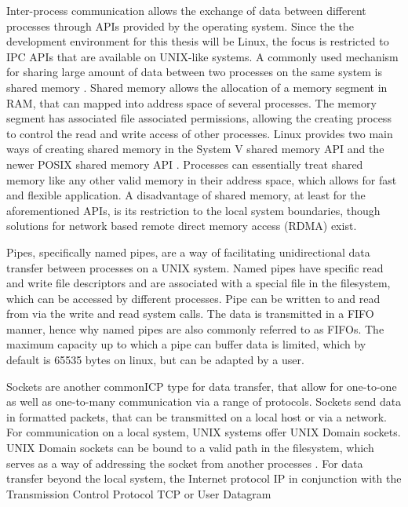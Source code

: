Inter-process communication allows the exchange of data between different processes through \acp{API} provided by the operating system. Since the
the development environment for this thesis will be Linux, the focus is restricted to \ac{IPC} APIs that are available on UNIX-like systems.
A commonly used mechanism for sharing large amount of data between two processes on the same system is shared memory \cite[p.301ff.]{stevens1998ipc}.
Shared memory allows the allocation of a memory segment in RAM, that can mapped into address space of several processes. The memory segment has associated file associated permissions, 
allowing the creating process to control the read and write access of other processes. Linux provides two main ways of creating
shared memory in the System V shared memory \ac{API} \cite{systemvshm} and the newer POSIX shared memory \ac{API} \cite{posixshm}. Processes can essentially treat shared memory like 
any other valid memory in their address space, which allows for fast and flexible application. A disadvantage of shared memory, at least for the aforementioned APIs, is its restriction 
to the local system boundaries, though solutions for network based remote direct memory access (RDMA) exist\cite{recio2007}.
\par 
{}
Pipes, specifically named pipes, are a way of facilitating unidirectional data transfer between processes on a UNIX system. Named pipes have specific read and write file descriptors and are  
associated with a special file in the filesystem, which can be accessed by different processes. Pipe can be written to and read from via the write and read system calls. The data is transmitted in 
a \ac{FIFO} manner, hence why named pipes are also commonly referred to as FIFOs. The maximum capacity up to which a pipe can buffer data is limited, which by default is 65535 bytes on linux, but can be adapted by a user. \cite{pipe}   
\par
{}
Sockets are another common\ac{ICP} type for data transfer, that allow for one-to-one as well as one-to-many 
communication via a range of protocols\cite[p.57ff.]{stevens1998sock}. Sockets send data in formatted packets, that can be transmitted on a local host or via a network. For communication on a local system, UNIX systems offer UNIX Domain sockets. UNIX Domain sockets can be bound to a valid path in the filesystem, which serves as a way of addressing
the socket from another processes \cite{unixsock}. For data transfer beyond the local system, the Internet protocol \ac{IP} in conjunction with the Transmission Control Protocol \ac{TCP} or User Datagram 
